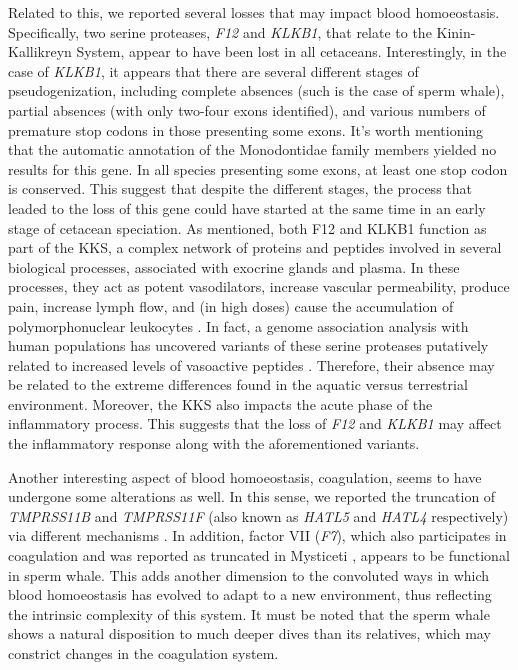 Related to this, we reported several losses that may impact blood homoeostasis.
Specifically, two serine proteases, \textit{F12} %
and \textit{KLKB1}, that relate to the Kinin-Kallikreyn System, appear to have been lost in all cetaceans.
Interestingly, in the case of \textit{KLKB1}, it appears that there are several different stages of pseudogenization, including complete absences (such is the case of sperm whale), partial absences (with only two-four exons identified), and various numbers of premature stop codons in those presenting some exons.
It's worth mentioning that the automatic annotation of the Monodontidae family members yielded no results for this gene.
In all species presenting some exons, at least one stop codon is conserved.
This suggest that despite the different stages, the process that leaded to the loss of this gene could have started at the same time in an early stage of cetacean speciation.
As mentioned, both F12 and KLKB1 function as part of the KKS, a complex network of proteins and peptides involved in several biological processes, associated with exocrine glands and plasma.
In these processes, they act as potent vasodilators, increase vascular permeability, produce pain, increase lymph flow, and (in high doses) cause the accumulation of polymorphonuclear leukocytes \cite{Bader2011}.
In fact, a genome association analysis with human populations has uncovered variants of these serine proteases putatively related to increased levels of vasoactive peptides \cite{Verweij2013a}.
Therefore, their absence may be related to the extreme differences found in the aquatic versus terrestrial environment.
Moreover, the KKS also impacts the acute phase of the inflammatory process.
This suggests that the loss of \textit{F12} and \textit{KLKB1} may affect the inflammatory response along with the aforementioned variants.

Another interesting aspect of blood homoeostasis, coagulation, seems to have undergone some alterations as well.
In this sense, we reported the truncation of \textit{TMPRSS11B} and \textit{TMPRSS11F} (also known as \textit{HATL5} and \textit{HATL4} respectively) via different mechanisms%
.
In addition, factor VII (\textit{F7}), which also participates in coagulation and was reported as truncated in Mysticeti \cite{Keane2015}, appears to be functional in sperm whale.
This adds another dimension to the convoluted ways in which blood homoeostasis has evolved to adapt to a new environment, thus reflecting the intrinsic complexity of this system.
It must be noted that the sperm whale shows a natural disposition to much deeper dives than its relatives, which may constrict changes in the coagulation system.

